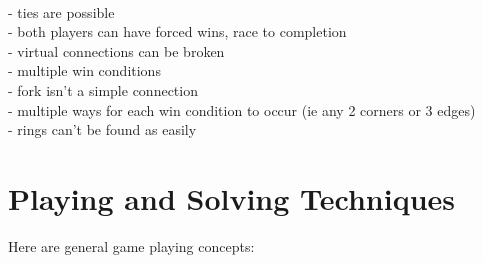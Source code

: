 \\- ties are possible
\\- both players can have forced wins, race to completion
\\- virtual connections can be broken
\\- multiple win conditions
\\- fork isn't a simple connection
\\- multiple ways for each win condition to occur (ie any 2 corners or 3 edges)
\\- rings can't be found as easily


\section{Playing and Solving Techniques}

Here are general game playing concepts:


